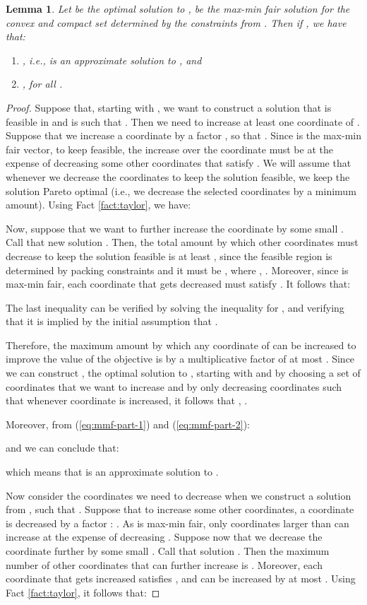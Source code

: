 \documentclass[11pt]{article}
\newtheorem{lemma}[theorem]{Lemma}
\newif\iffullpaper
\begin{document}
\begin{lemma}\label{lemma:mmf-alpha-fair}
Let  be the optimal solution to ,  be the max-min fair solution for the convex and compact set determined by the constraints from . Then if , we have that:
\begin{enumerate}
\item , i.e.,  is an approximate solution to , and
\item , for all .
\end{enumerate}
\end{lemma}
\iffullpaper
\begin{proof}
Suppose that, starting with , we want to construct a solution  that is feasible in  and is such that . Then we need to increase at least one coordinate  of . Suppose that we increase a coordinate  by a factor , so that . Since  is the max-min fair vector, to keep  feasible, the increase over the  coordinate must be at the expense of decreasing some other coordinates  that satisfy . We will assume that whenever we decrease the coordinates to keep the solution feasible, we keep the solution Pareto optimal (i.e., we decrease the selected coordinates by a minimum amount). Using Fact \ref{fact:taylor}, we have:


Now, suppose that we want to further increase the  coordinate by some small . Call that new solution . Then, the total amount by which other coordinates must decrease to keep the solution feasible is at least , since the feasible region is determined by packing constraints and it must be , where , . Moreover, since  is max-min fair, each coordinate  that gets decreased must satisfy . It follows that:

The last inequality can be verified by solving the inequality  for , and verifying that it is implied by the initial assumption that .

Therefore, the maximum amount by which any coordinate of  can be increased to improve the value of the objective  is by a multiplicative factor of at most . Since we can construct , the optimal solution to , starting with  and by choosing a set of coordinates  that we want to increase and by only decreasing coordinates  such that  whenever coordinate  is increased, it follows that , .

Moreover, from (\ref{eq:mmf-part-1}) and (\ref{eq:mmf-part-2}):

and we can conclude that:

which means that  is an approximate solution to .

Now consider the coordinates we need to decrease when we construct a solution  from , such that . Suppose that to increase some other coordinates, a coordinate  is decreased by a factor : . As  is max-min fair, only coordinates larger than  can increase at the expense of decreasing . Suppose now that we decrease the  coordinate further by some small . Call that solution . Then the maximum number of other coordinates  that can further increase is . Moreover, each coordinate  that gets increased satisfies , and can be increased by at most . Using Fact \ref{fact:taylor}, it follows that: 


\end{proof}
\end{document}

